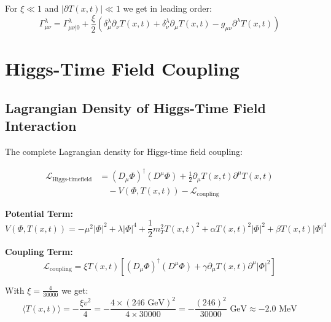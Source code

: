 \documentclass[12pt,a4paper]{report}
\newcommand{\Tfield}{T(x,t)}  %
\newcommand{\xipar}{\xi}      %
\begin{document}
	For $\xipar \ll 1$ and $|\partial \Tfield| \ll 1$ we get in leading order:
	\begin{equation}\label{eq:christoffel_leading_order}
		\Gamma^\lambda_{\mu\nu} = \Gamma^\lambda_{\mu\nu|0} + \frac{\xipar}{2} \left(\delta^\lambda_\mu \partial_\nu \Tfield + \delta^\lambda_\nu \partial_\mu \Tfield - g_{\mu\nu} \partial^\lambda \Tfield\right)
	\end{equation}
	
	\section{Higgs-Time Field Coupling}\label{sec:higgs_timefield_coupling_extended}
	
	\subsection{Lagrangian Density of Higgs-Time Field Interaction}\label{subsec:higgs_timefield_lagrangian}
	
	The complete Lagrangian density for Higgs-time field coupling:
	
	\begin{align}\label{eq:higgs_timefield_lagrangian_complete}
		\mathcal{L}_{\text{Higgs-timefield}} &= (D_\mu \Phi)^\dagger (D^\mu \Phi) + \frac{1}{2} \partial_\mu \Tfield \partial^\mu \Tfield \\
		&\quad - V(\Phi, \Tfield) - \mathcal{L}_{\text{coupling}}
	\end{align}
	
	\textbf{Potential Term:}
	\begin{equation}
		V(\Phi, \Tfield) = -\mu^2 |\Phi|^2 + \lambda |\Phi|^4 + \frac{1}{2} m_T^2 \Tfield^2 + \alpha \Tfield^2 |\Phi|^2 + \beta \Tfield |\Phi|^4
	\end{equation}
	
	\textbf{Coupling Term:}
	\begin{equation}
		\mathcal{L}_{\text{coupling}} = \xipar \Tfield \left[(D_\mu \Phi)^\dagger (D^\mu \Phi) + \gamma \partial_\mu \Tfield \partial^\mu |\Phi|^2\right]
	\end{equation}
	
	With $\xipar = \frac{4}{30000}$ we get:
	\begin{equation}
		\langle \Tfield \rangle = -\frac{\xipar v^2}{4} = -\frac{4 \times (246 \text{ GeV})^2}{4 \times 30000} = -\frac{(246)^2}{30000} \text{ GeV} \approx -2.0 \text{ MeV}
	\end{equation}
	
\end{document}
